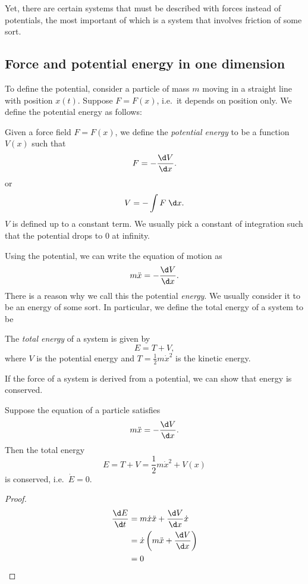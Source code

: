 \documentclass[a4paper]{article}
\begin{document}
Yet, there are certain systems that must be described with forces instead of potentials, the most important of which is a system that involves friction of some sort.

\subsection{Force and potential energy in one dimension}
To define the potential, consider a particle of mass $m$ moving in a straight line with position $x(t)$. Suppose $F = F(x)$, i.e.\ it depends on position only. We define the potential energy as follows:
\begin{defi}
  Given a force field $F = F(x)$, we define the \emph{potential energy} to be a function $V(x)$ such that
  \[
    F = -\frac{\d V}{\d x}.
  \]
  or
  \[
    V = -\int F \;\d x.
  \]
  $V$ is defined up to a constant term. We usually pick a constant of integration such that the potential drops to $0$ at infinity.
\end{defi}
Using the potential, we can write the equation of motion as
\[
  m\ddot{x} = -\frac{\d V}{\d x}.
\]
There is a reason why we call this the potential \emph{energy}. We usually consider it to be an energy of some sort. In particular, we define the total energy of a system to be
\begin{defi}
  The \emph{total energy} of a system is given by
  \[
    E = T + V,
  \]
  where $V$ is the potential energy and $T = \frac{1}{2}m\dot{x}^2$ is the kinetic energy.
\end{defi}
If the force of a system is derived from a potential, we can show that energy is conserved.
\begin{prop}
  Suppose the equation of a particle satisfies
  \[
    m\ddot{x} = -\frac{\d V}{\d x}.
  \]
  Then the total energy
  \[
    E = T + V = \frac{1}{2} m\dot{x}^2 + V(x)
  \]
  is conserved, i.e.\ $\dot{E} = 0$.
\end{prop}

\begin{proof}
  \begin{align*}
    \frac{\d E}{\d t} &= m\dot{x}\ddot{x} + \frac{\d V}{\d x}\dot{x}\\
    &= \dot{x}\left(m\ddot{x} + \frac{\d V}{\d x}\right)\\
    &= 0
  \end{align*}
\end{proof}
\end{document}
